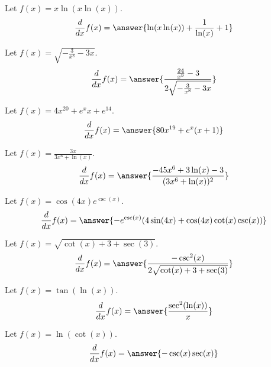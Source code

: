\documentclass{ximera}
\begin{document}
\begin{shuffle}
\begin{exercise}
\begin{exercise}
Let $f(x)=x \ln (x \ln (x))$.
\[
\ddx f(x) = \answer{\ln (x \ln (x))+\frac{1}{\ln (x)}+1}
\]
\end{exercise}

\begin{exercise}
Let $f(x)=\sqrt{-\frac{3}{x^8}-3 x}$.
\[
\ddx f(x) = \answer{\frac{\frac{24}{x^9}-3}{2 \sqrt{-\frac{3}{x^8}-3 x}}}
\]
\end{exercise}

\begin{exercise}
Let $f(x)=4 x^{20}+e^x x+e^{14}$.
\[
\ddx f(x) = \answer{80 x^{19}+e^x (x+1)}
\]
\end{exercise}



\begin{exercise}
Let $f(x)=\frac{3 x}{3 x^6+\ln (x)}$.
\[
\ddx f(x) = \answer{\frac{-45 x^6+3 \ln (x)-3}{(3 x^6+\ln (x))^2}}
\]
\end{exercise}

\begin{exercise}
Let $f(x)=\cos (4 x) e^{\csc (x)}$.
\[
\ddx f(x) = \answer{-e^{\csc (x)} (4 \sin (4 x)+\cos (4 x) \cot (x) \csc (x))}
\]
\end{exercise}

\begin{exercise}
Let $f(x)=\sqrt{\cot (x)+3+\sec (3)}$.
\[
\ddx f(x) = \answer{\frac{-\csc^2(x)}{2 \sqrt{\cot (x)+3+\sec (3)}}}
\]
\end{exercise}

\begin{exercise}
Let $f(x)=\tan (\ln (x))$.
\[
\ddx f(x) = \answer{\frac{\sec ^2(\ln (x))}{x}}
\]
\end{exercise}

\begin{exercise}
Let $f(x)=\ln (\cot (x))$.
\[
\ddx f(x) = \answer{-\csc (x) \sec (x)}
\]
\end{exercise}


\end{exercise}
\end{shuffle}
\end{document}
